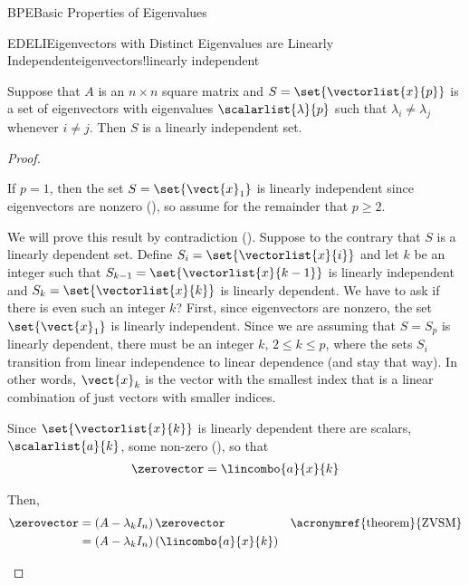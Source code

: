 \begin{subsect}{BPE}{Basic Properties of Eigenvalues}
%
\begin{theorem}{EDELI}{Eigenvectors with Distinct Eigenvalues are Linearly Independent}{eigenvectors!linearly independent}
\begin{para}Suppose that $A$ is an $n\times n$ square matrix and $S=\set{\vectorlist{x}{p}}$ is a set of eigenvectors with eigenvalues $\scalarlist{\lambda}{p}$ such that $\lambda_i\neq\lambda_j$ whenever $i\neq j$.  Then $S$ is a linearly independent set.\end{para}
\end{theorem}
%
\begin{proof}
\begin{para}If $p=1$, then the set $S=\set{\vect{x}_1}$ is linearly independent since eigenvectors are nonzero (), so assume for the remainder that $p\geq 2$.\end{para}
%
\begin{para}We will prove this result by contradiction ().  Suppose to the contrary that $S$ is a linearly dependent set.  Define $S_i=\set{\vectorlist{x}{i}}$ and let
$k$ be an integer such that $S_{k-1}=\set{\vectorlist{x}{k-1}}$ is linearly independent and $S_k=\set{\vectorlist{x}{k}}$ is linearly dependent.  We have to ask if there is even such an integer $k$?  First, since eigenvectors are nonzero, the set $\set{\vect{x}_1}$ is linearly independent.  Since we are assuming that $S=S_p$ is linearly dependent, there must be an integer $k$, $2\leq k\leq p$, where the sets $S_i$ transition from linear independence to linear dependence (and stay that way). In other words, $\vect{x}_k$ is the vector with the smallest index that is a linear combination of just vectors with smaller indices.\end{para}
%
\begin{para}Since $\set{\vectorlist{x}{k}}$ is linearly dependent there are scalars, $\scalarlist{a}{k}$, some non-zero (), so that
%
\begin{align*}
\zerovector=\lincombo{a}{x}{k}
\end{align*}
\end{para}
%
\begin{para}Then,
%
\begin{align*}
\zerovector
&=\left(A-\lambda_kI_n\right)\zerovector
&&\text{\acronymref{theorem}{ZVSM}}\\
%
&=\left(A-\lambda_kI_n\right)\left(\lincombo{a}{x}{k}\right)

\end{align*}
\end{para}
\end{proof}
\end{subsect}
